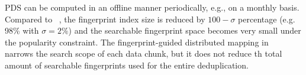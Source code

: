 \begin{itemize}
PDS  can be computed in an offline manner periodically, e.g., on a monthly basis.
Compared to ~\cite{bottleneck08}, the fingerprint index  size is reduced by $100-\sigma$ percentage
(e.g. 98\% with $\sigma=2\%$)
and the searchable fingerprint space  becomes very small under the popularity constraint.  
The fingerprint-guided distributed mapping in ~\cite{extreme_binning09,Dong2011} narrows
the search scope of each data chunk, but it does not reduce th total amount of searchable fingerprints
used for the entire deduplication. 


\end{itemize}
